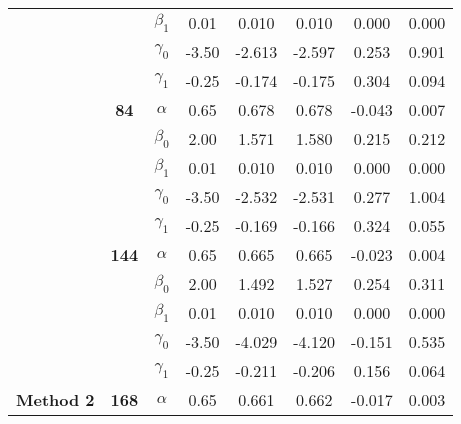 \begin{table}[h]
\begin{tabular}[t]{>{}c>{}ccccccc}
 &  & $\beta_1$ & 0.01 & 0.010 & 0.010 & 0.000 & 0.000\\

 &  & $\gamma_0$ & -3.50 & -2.613 & -2.597 & 0.253 & 0.901\\

 &  & $\gamma_1$ & -0.25 & -0.174 & -0.175 & 0.304 & 0.094\\

 & \multirow{-5}{*}{\centering\arraybackslash \textbf{84}} & $\alpha$ & 0.65 & 0.678 & 0.678 & -0.043 & 0.007\\

 &  & $\beta_0$ & 2.00 & 1.571 & 1.580 & 0.215 & 0.212\\

 &  & $\beta_1$ & 0.01 & 0.010 & 0.010 & 0.000 & 0.000\\

 &  & $\gamma_0$ & -3.50 & -2.532 & -2.531 & 0.277 & 1.004\\

 &  & $\gamma_1$ & -0.25 & -0.169 & -0.166 & 0.324 & 0.055\\

 & \multirow{-5}{*}{\centering\arraybackslash \textbf{144}} & $\alpha$ & 0.65 & 0.665 & 0.665 & -0.023 & 0.004\\

 &  & $\beta_0$ & 2.00 & 1.492 & 1.527 & 0.254 & 0.311\\

 &  & $\beta_1$ & 0.01 & 0.010 & 0.010 & 0.000 & 0.000\\

 &  & $\gamma_0$ & -3.50 & -4.029 & -4.120 & -0.151 & 0.535\\

 &  & $\gamma_1$ & -0.25 & -0.211 & -0.206 & 0.156 & 0.064\\

\multirow{-15}{*}{\centering\arraybackslash \textbf{Method 2}} & \multirow{-5}{*}{\centering\arraybackslash \textbf{168}} & $\alpha$ & 0.65 & 0.661 & 0.662 & -0.017 & 0.003\\
\bottomrule
\end{tabular}
\end{table}
